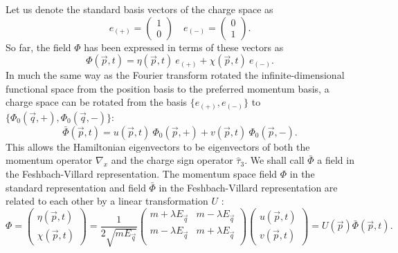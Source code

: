 \documentclass[11pt]{article}
\numberwithin{equation}{section}
\begin{document}
      Let us denote the standard basis vectors of the charge space as
      \begin{equation}
        e_{(+)} = 
        \begin{pmatrix}
          1 \\
          0
        \end{pmatrix} \quad
        e_{(-)} = 
        \begin{pmatrix}
          0 \\
          1
        \end{pmatrix}.
      \end{equation}
      So far, the field $\Phi$ has been expressed in terms of these vectors as
      \begin{equation}
        \Phi(\vec p, t) = \eta(\vec p,t) \ e_{(+)} + \chi(\vec p,t) \ e_{(-)}.
      \end{equation}
      In much the same way as the Fourier transform rotated the infinite-dimensional functional space
      from the position basis to the preferred momentum basis, a charge space can be rotated 
      from the basis $\{ e_{(+)},e_{(-)} \}$ to $\{\Phi_0(\vec q,+),\Phi_0(\vec q,-)\}$:
      \begin{equation}
       \bar \Phi(\vec p,t) = u(\vec p,t) \ \Phi_0(\vec p,+) + v(\vec p,t) \ \Phi_0(\vec p,-).
      \end{equation}
      This allows the Hamiltonian eigenvectors to be eigenvectors of both the momentum operator $\nabla_x$ and
      the charge sign operator $\hat \tau_3$. We shall call $\bar \Phi$ a field in the Feshbach-Villard representation.
      The momentum space field $\Phi$ in the standard representation and field $\bar \Phi$ in the Feshbach-Villard representation
      are related to each other by a linear transformation $U$ \cite{feshbach}:
            \begin{equation}
        \Phi = 
        \begin{pmatrix}
          \eta(\vec p,t) \\
          \chi(\vec p,t)
        \end{pmatrix}
        = \frac{1}{2 \sqrt{m E_{\vec q}}}
        \begin{pmatrix}
          m + \lambda E_{\vec q} & m - \lambda E_{\vec q} \\
          m - \lambda E_{\vec q} & m + \lambda E_{\vec q} \\
        \end{pmatrix}
        \begin{pmatrix}
          u(\vec p,t) \\
          v(\vec p,t)
        \end{pmatrix}
        = U(\vec p) \bar \Phi(\vec p,t).
      \end{equation}
\end{document}
